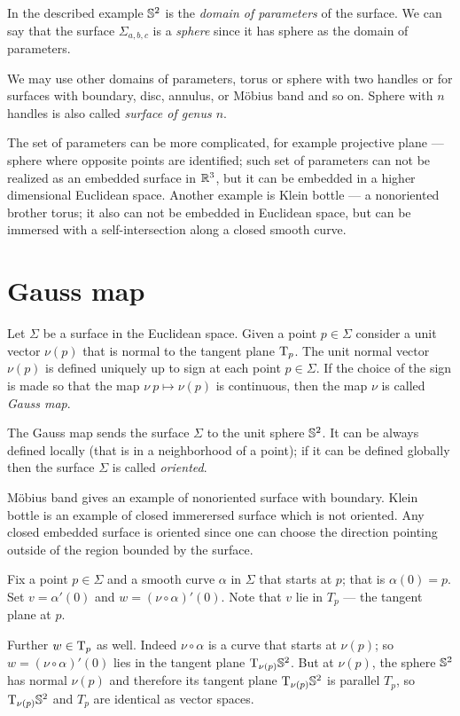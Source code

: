 In the described example $\mathbb{S}^2$ is the \emph{domain of parameters} of the surface.
We can say that the surface $\Sigma_{a,b,c}$ is a \emph{sphere} since it has sphere as the domain of parameters.

We may use other domains of parameters, torus or sphere with two handles or for surfaces with boundary, disc, annulus, or M\"obius band and so on.
Sphere with $n$ handles is also called \emph{surface of genus $n$}.

The set of parameters can be more complicated, for example projective plane --- sphere where opposite points are identified; such set of parameters can not be realized as an embedded surface in $\mathbb{R}^3$, but it can be embedded in a higher dimensional Euclidean space.
Another example is Klein bottle --- a nonoriented brother torus;
it also can not be embedded in Euclidean space, but can be immersed with a self-intersection along a closed smooth curve.



\section{Gauss map}

Let $\Sigma$ be a surface in the Euclidean space.
Given a point $p\in\Sigma$ consider a unit vector $\nu(p)$ that is normal to the tangent plane $\mathrm{T}_p$. 
The unit normal vector $\nu(p)$ is defined uniquely up to sign at each point $p\in \Sigma$.
If the choice of the sign is made so that the map $\nu\:p\mapsto \nu(p)$ is continuous,
then the map $\nu$ is called \emph{Gauss map}.

The Gauss map sends the surface $\Sigma$ to the unit sphere $\mathbb{S}^2$.
It can be always defined locally (that is in a neighborhood of a point);
if it can be defined globally then the surface $\Sigma$ is called \emph{oriented}.

M\"obius band gives an example of nonoriented surface with boundary.
Klein bottle is an example of closed immerersed surface which is not oriented.
Any closed embedded surface is oriented since one can choose the  direction pointing outside of the region bounded by the surface.

Fix a point $p\in \Sigma$ and a smooth curve $\alpha$ in $\Sigma$ that starts at $p$;
that is $\alpha(0)=p$.
Set  $v=\alpha'(0)$ and $w=(\nu\circ\alpha)'(0)$.
Note that $v$ lie in $T_p$ --- the tangent plane at $p$.

Further $w\in \mathrm{T}_p$ as well.
Indeed $\nu\circ\alpha$ is a curve that starts at $\nu(p)$;
so $w=(\nu\circ\alpha)'(0)$ lies in the tangent plane $\mathrm{T}_{\nu(p)}\mathbb{S}^2$.
But at $\nu(p)$, the sphere $\mathbb{S}^2$ has normal $\nu(p)$ and therefore its tangent plane $\mathrm{T}_{\nu(p)}\mathbb{S}^2$ is parallel $T_p$, so $\mathrm{T}_{\nu(p)}\mathbb{S}^2$ and $T_p$ are identical as vector spaces.

